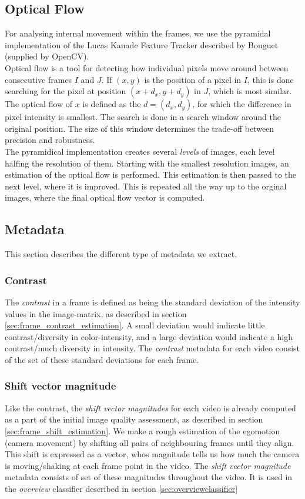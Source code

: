 \subsection{Optical Flow}
%
For analysing internal movement within the frames, we use the pyramidal implementation of the Lucas Kanade Feature Tracker described by Bouguet\cite{Bouguet2000} (supplied by OpenCV).\\
Optical flow is a tool for detecting how individual pixels move around between consecutive frames $I$ and $J$. If $(x,y)$ is the position of a pixel in $I$, this is done searching for the pixel at position $(x+d_x,y+d_y)$ in $J$, which is most similar. The optical flow of $x$ is defined as the $d=(d_x,d_y)$, for which the difference in pixel intensity is smallest. The search is done in a search window around the original position. The size of this window determines the trade-off between precision and robustness.\\
The pyramidical implementation creates several \textit{levels} of images, each level halfing the resolution of them. Starting with the smallest resolution images, an estimation of the optical flow is performed. This estimation is then passed to the next level, where it is improved. This is repeated all the way up to the orginal images, where the final optical flow vector is computed.
%
\subsection{Metadata}
%
This section describes the different type of metadata we extract.
%
\subsubsection{Contrast}\label{sec:contrastdata}
%
The \textit{contrast} in a frame is defined as being the standard deviation of the intensity values in the image-matrix, as described in section \ref{sec:frame_contrast_estimation}. A small deviation would indicate little contrast/diversity in color-intensity, and a large deviation would indicate a high contrast/much diversity in intensity. The \textit{contrast} metadata for each video consist of the set of these standard deviations for each frame.
%
\subsubsection{Shift vector magnitude}\label{sec:svmdata}
%
Like the contrast, the \textit{shift vector magnitudes} for each video is already computed as a part of the initial image quality assessment, as described in section \ref{sec:frame_shift_estimation}. We make a rough estimation of the egomotion (camera movement) by shifting all pairs of neighbouring frames until they align. This shift is expressed as a vector, whos magnitude tells us how much the camera is moving/shaking at each frame point in the video. The \textit{shift vector magnitude} metadata consists of set of these magnitudes throughout the video. It is used in the \textit{overview} classifier described in section \ref{sec:overviewclassifier}
%
